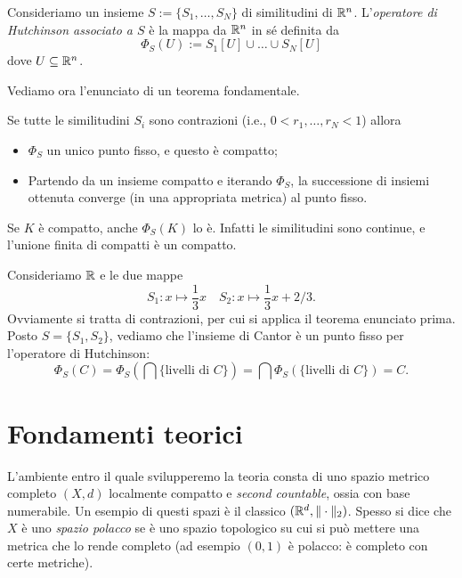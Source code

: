 \begin{definizione}
	Consideriamo un insieme $S:=\{S_{1},\dots,S_{N}\}$ di similitudini di $\mathbb{R}^{n}$. L'\emph{operatore di Hutchinson associato a $S$} è la mappa da $\mathbb{R}^{n}$ in sé definita da 
	$$\Phi_{S}(U) := S_{1}[U]\cup \dots \cup S_{N}[U]$$
	dove $U\subseteq\mathbb{R}^{n}$.
\end{definizione}

Vediamo ora l'enunciato di un teorema fondamentale. 
\begin{teorema}
	Se tutte le similitudini $S_{i}$ sono contrazioni (i.e., $0<r_{1},\dots,r_{N}<1$) allora
	\begin{itemize}
		\item $\Phi_{S}$ un unico punto fisso, e questo è compatto; 
		\item Partendo da un insieme compatto e iterando $\Phi_{S}$, la successione di insiemi ottenuta converge (in una appropriata metrica) al punto fisso.
	\end{itemize}
\end{teorema}
\begin{osservazione}
	Se $K$ è compatto, anche $\Phi_{S}(K)$ lo è. Infatti le similitudini sono continue, e l'unione finita di compatti è un compatto. 
\end{osservazione}

\begin{esempio}
	Consideriamo $\mathbb{R}$ e le due mappe 
	$$S_{1}:x\mapsto \frac{1}{3}x\quad S_{2}:x\mapsto \frac{1}{3}x + 2/3.$$
	Ovviamente si tratta di contrazioni, per cui si applica il teorema enunciato prima.
	Posto $S = \{S_{1},S_{2}\}$, vediamo che l'insieme di Cantor è un punto fisso per l'operatore di Hutchinson:
	$$\Phi_{S}(C) = \Phi_{S}(\bigcap\{\text{livelli di }C\}) = \bigcap \Phi_{S}(\{\text{livelli di }C\}) = C.$$
\end{esempio}


\section{Fondamenti teorici}

L'ambiente entro il quale svilupperemo la teoria consta di uno spazio metrico completo $(X,d)$ localmente compatto e \emph{second countable}, ossia con base numerabile. Un esempio di questi spazi è il classico $(\mathbb{R}^{d}, \|\cdot\|_{2})$. 
Spesso si dice che $X$ è uno \emph{spazio polacco} se è uno spazio topologico su cui si può mettere una metrica che lo rende completo (ad esempio $(0,1)$ è polacco: è completo con certe metriche). 

